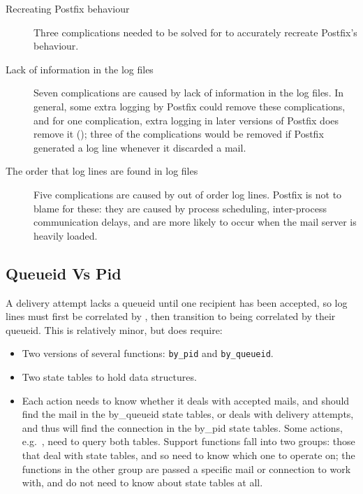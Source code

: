 \begin{description}

    \item [Recreating Postfix behaviour] Three complications needed to be
        solved for \parsername{} to accurately recreate Postfix's
        behaviour.

    \item [Lack of information in the log files] Seven complications are
        caused by lack of information in the log files.  In general, some
        extra logging by Postfix could remove these complications, and for
        one complication, extra logging in later versions of Postfix does
        remove it (); three of
        the complications would be removed if Postfix generated a log line
        whenever it discarded a mail.

    \item [The order that log lines are found in log files] Five
        complications are caused by out of order log lines.  Postfix is not
        to blame for these: they are caused by process scheduling,
        inter-process communication delays, and are more likely to occur
        when the mail server is heavily loaded.

\end{description}

\subsection{Queueid Vs Pid}

\label{queueid vs pid}

A delivery attempt lacks a queueid until one recipient has been accepted,
so log lines must first be correlated by  , then
transition to being correlated by their queueid.  This is relatively minor,
but does require:

\begin{itemize}

    \squeezeitems{}

    \item Two versions of several functions: \texttt{by\_pid} and
        \texttt{by\_queueid}.

    \item Two state tables to hold data structures.

    \item Each action needs to know whether it deals with accepted mails,
        and should find the mail in the by\_queueid state tables, or deals
        with delivery attempts, and thus will find the connection in the
        by\_pid state tables.  Some actions, e.g.\
        , need to query both tables.  Support
        functions fall into two groups: those that deal with state tables,
        and so need to know which one to operate on; the functions in the
        other group are passed a specific mail or connection to work with,
        and do not need to know about state tables at all.

\end{itemize}

